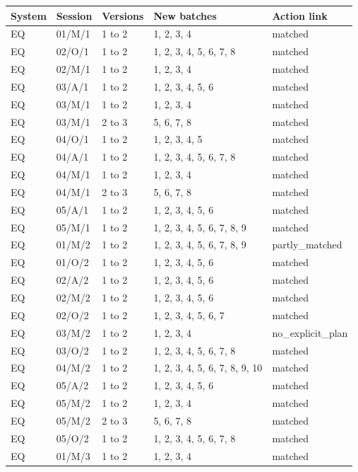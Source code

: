 \documentclass[10pt,a4paper]{article}
\begin{document}
{\def\LTcaptype{table} %
\small\begin{longtable}[]{@{}lllll@{}}
\toprule\noalign{}
System & Session & Versions & New batches & Action link \\
\midrule\noalign{}
\endhead
\bottomrule\noalign{}
\endlastfoot
EQ & 01/M/1 & 1 to 2 & 1, 2, 3, 4 & matched \\
EQ & 02/O/1 & 1 to 2 & 1, 2, 3, 4, 5, 6, 7, 8 & matched \\
EQ & 02/M/1 & 1 to 2 & 1, 2, 3, 4 & matched \\
EQ & 03/A/1 & 1 to 2 & 1, 2, 3, 4, 5, 6 & matched \\
EQ & 03/M/1 & 1 to 2 & 1, 2, 3, 4 & matched \\
EQ & 03/M/1 & 2 to 3 & 5, 6, 7, 8 & matched \\
EQ & 04/O/1 & 1 to 2 & 1, 2, 3, 4, 5 & matched \\
EQ & 04/A/1 & 1 to 2 & 1, 2, 3, 4, 5, 6, 7, 8 & matched \\
EQ & 04/M/1 & 1 to 2 & 1, 2, 3, 4 & matched \\
EQ & 04/M/1 & 2 to 3 & 5, 6, 7, 8 & matched \\
EQ & 05/A/1 & 1 to 2 & 1, 2, 3, 4, 5, 6 & matched \\
EQ & 05/M/1 & 1 to 2 & 1, 2, 3, 4, 5, 6, 7, 8, 9 & matched \\
EQ & 01/M/2 & 1 to 2 & 1, 2, 3, 4, 5, 6, 7, 8, 9 & partly\_matched \\
EQ & 01/O/2 & 1 to 2 & 1, 2, 3, 4, 5, 6 & matched \\
EQ & 02/A/2 & 1 to 2 & 1, 2, 3, 4, 5, 6 & matched \\
EQ & 02/M/2 & 1 to 2 & 1, 2, 3, 4, 5, 6 & matched \\
EQ & 02/O/2 & 1 to 2 & 1, 2, 3, 4, 5, 6, 7 & matched \\
EQ & 03/M/2 & 1 to 2 & 1, 2, 3, 4 & no\_explicit\_plan \\
EQ & 03/O/2 & 1 to 2 & 1, 2, 3, 4, 5, 6, 7, 8 & matched \\
EQ & 04/M/2 & 1 to 2 & 1, 2, 3, 4, 5, 6, 7, 8, 9, 10 & matched \\
EQ & 05/A/2 & 1 to 2 & 1, 2, 3, 4, 5, 6 & matched \\
EQ & 05/M/2 & 1 to 2 & 1, 2, 3, 4 & matched \\
EQ & 05/M/2 & 2 to 3 & 5, 6, 7, 8 & matched \\
EQ & 05/O/2 & 1 to 2 & 1, 2, 3, 4, 5, 6, 7, 8 & matched \\
EQ & 01/M/3 & 1 to 2 & 1, 2, 3, 4 & matched \\

\end{longtable}}
\end{document}
